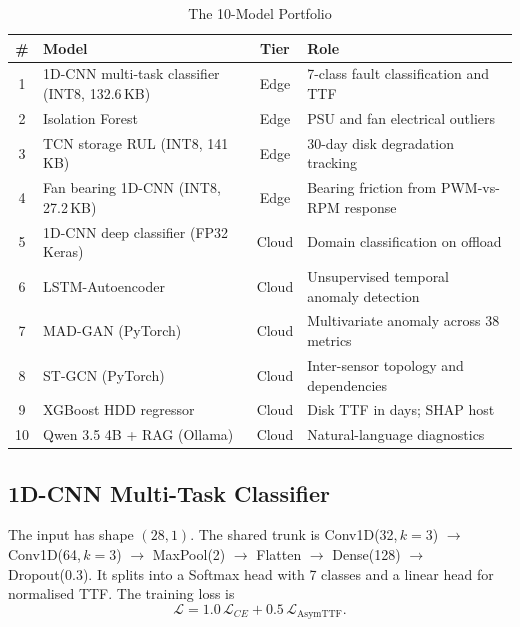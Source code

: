\documentclass[12pt,a4paper]{report}
\begin{document}
\begin{table}[h!]
  \centering
  \caption{The 10-Model Portfolio}
  \label{tab:models}
  \vspace*{5pt}
  \footnotesize
  \renewcommand{\arraystretch}{1.4}
  \begin{tabular}{|c|p{4.4cm}|c|p{5.2cm}|}
    \hline
    \textbf{\#} & \textbf{Model} & \textbf{Tier} & \textbf{Role} \\ \hline
    1 & 1D-CNN multi-task classifier (INT8, 132.6\,KB) & Edge & 7-class fault classification and TTF \\ \hline
    2 & Isolation Forest & Edge & PSU and fan electrical outliers \\ \hline
    3 & TCN storage RUL (INT8, 141\,KB) & Edge & 30-day disk degradation tracking \\ \hline
    4 & Fan bearing 1D-CNN (INT8, 27.2\,KB) & Edge & Bearing friction from PWM-vs-RPM response \\ \hline
    5 & 1D-CNN deep classifier (FP32 Keras) & Cloud & Domain classification on offload \\ \hline
    6 & LSTM-Autoencoder & Cloud & Unsupervised temporal anomaly detection \\ \hline
    7 & MAD-GAN (PyTorch) & Cloud & Multivariate anomaly across 38 metrics \\ \hline
    8 & ST-GCN (PyTorch) & Cloud & Inter-sensor topology and dependencies \\ \hline
    9 & XGBoost HDD regressor & Cloud & Disk TTF in days; SHAP host \\ \hline
    10 & Qwen 3.5 4B + RAG (Ollama) & Cloud & Natural-language diagnostics \\ \hline
  \end{tabular}
\end{table}

\subsection{1D-CNN Multi-Task Classifier}
The input has shape $(28,1)$. The shared trunk is Conv1D(32,\,$k{=}3$) $\rightarrow$ Conv1D(64,\,$k{=}3$) $\rightarrow$ MaxPool(2) $\rightarrow$ Flatten $\rightarrow$ Dense(128) $\rightarrow$ Dropout(0.3). It splits into a Softmax head with 7 classes and a linear head for normalised TTF. The training loss is
\begin{equation}\label{eq:multitask}
  \mathcal{L} = 1.0\,\mathcal{L}_{CE} + 0.5\,\mathcal{L}_{\text{AsymTTF}}.
\end{equation}
\end{document}
